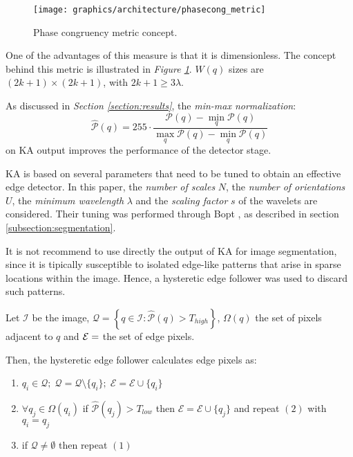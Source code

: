         \begin{figure}
	    	\centering
	    	\texttt{[image: graphics/architecture/phasecong\_metric]}
	    	\caption{Phase congruency metric concept.}
	    	\label{fig:phase-congruency-metric}
	    \end{figure}
        \par{
            One of the advantages of this measure is that it is dimensionless. The concept behind this metric is illustrated in \emph{Figure \ref{fig:phase-congruency-metric}}. $W(q)$ sizes are $(2k+1)\times(2k+1)$, with $2k+1 \geq 3\lambda$.
		}
        \par{
        	As discussed in \emph{Section \ref{section:results}}, the \emph{min-max normalization}:
        	\begin{equation*}
        	\hat{\mathcal{P}}(q) = 255 \cdot \frac{\mathcal{P}(q)-\min_q\mathcal{P}(q)}{\max_q\mathcal{P}(q)-\min_q\mathcal{P}(q)}
        	\end{equation*}
        	 on KA output improves the performance of the detector stage.
        }
        \par{
        	KA is based on several parameters that need to be tuned to obtain an effective edge detector. In this paper, the \emph{number of scales} $N$, the \emph{number of orientations} $U$, the \emph{minimum wavelength} $\lambda$ and the \emph{scaling factor} $s$ of the wavelets are considered. Their tuning was performed through Bopt \cite{arXiv:2012arXiv1206.2944S,arXiv:2018arXiv180702811F, matlab:bayesian-opt}, as described in section \ref{subsection:segmentation}.
        }
        \par{
            It is not recommend to use directly the output of KA for image segmentation, since it is tipically susceptible to isolated edge-like patterns that arise in sparse locations within the image. Hence, a hysteretic edge follower was used to discard such patterns.
        }
        \par{
            Let $\mathcal{I}$ be the image, $\mathcal{Q} = \left\{q \in \mathcal{I} \colon \hat{\mathcal{P}}(q) > T_{high}\right\}$, $\Omega(q)$ the set of  pixels adjacent to $q$ and $\mathcal{E} = \empty$ the set of edge pixels.
        }
        \par{
            Then, the hysteretic edge follower calculates edge pixels as:
            \begin{enumerate}
    			\item $q_i \in \mathcal{Q};\; \mathcal{Q} = \mathcal{Q} \setminus \{q_i\};\;\mathcal{E} = \mathcal{E} \cup \{q_i\}$
    			\item $\forall q_j \in \Omega(q_i)$ if $\hat{\mathcal{P}}(q_j) > T_{low}$ then $\mathcal{E} = \mathcal{E} \cup \{q_j\}$ and repeat $(2)$ with $q_i = q_j$
    			\item if $\mathcal{Q} \neq \emptyset$ then repeat $(1)$
    		\end{enumerate}
        }
